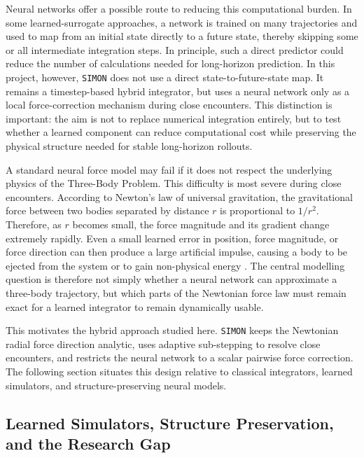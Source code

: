 \documentclass[12pt]{article}
\begin{document}
Neural networks offer a possible route to reducing this computational burden. In some learned-surrogate approaches, a network is trained on many trajectories and used to map from an initial state directly to a future state, thereby skipping some or all intermediate integration steps. In principle, such a direct predictor could reduce the number of calculations needed for long-horizon prediction. In this project, however, \texttt{SIMON} does not use a direct state-to-future-state map. It remains a timestep-based hybrid integrator, but uses a neural network only as a local force-correction mechanism during close encounters. This distinction is important: the aim is not to replace numerical integration entirely, but to test whether a learned component can reduce computational cost while preserving the physical structure needed for stable long-horizon rollouts.

A standard neural force model may fail if it does not respect the underlying physics of the Three-Body Problem. This difficulty is most severe during close encounters. According to Newton's law of universal gravitation, the gravitational force between two bodies separated by distance $r$ is proportional to $1/r^2$. Therefore, as $r$ becomes small, the force magnitude and its gradient change extremely rapidly. Even a small learned error in position, force magnitude, or force direction can then produce a large artificial impulse, causing a body to be ejected from the system or to gain non-physical energy \cite{Dehnen2001}. The central modelling question is therefore not simply whether a neural network can approximate a three-body trajectory, but which parts of the Newtonian force law must remain exact for a learned integrator to remain dynamically usable.

This motivates the hybrid approach studied here. \texttt{SIMON} keeps the Newtonian radial force direction analytic, uses adaptive sub-stepping to resolve close encounters, and restricts the neural network to a scalar pairwise force correction. The following section situates this design relative to classical integrators, learned simulators, and structure-preserving neural models.

\subsection{Learned Simulators, Structure Preservation, and the Research Gap}
\end{document}
